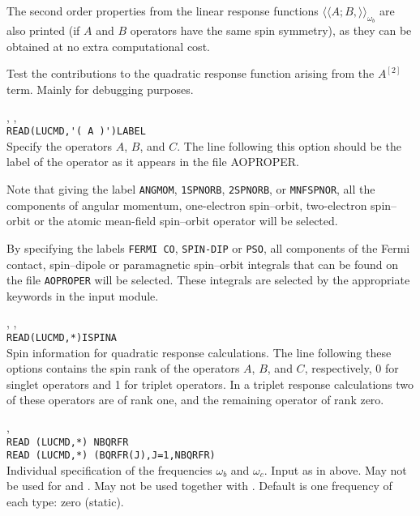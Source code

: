 The second order properties from the linear response functions
$\langle\!\langle A;B,\rangle\!\rangle_{\omega_b}$ are also printed
(if $A$ and $B$ operators have the same spin symmetry),
as they can be obtained at no extra computational cost.

\begin{description}

\item{}
Test the contributions to the quadratic response function arising from
the $A^{\left[2\right]}$ term. Mainly for debugging purposes.

\item{, , }\\
\verb|READ(LUCMD,'( A )')LABEL|\\
Specify the operators $A$, $B$, and $C$. The line following this
option should be the label of the operator as it appears in the file
AOPROPER.

Note that giving the label \verb|ANGMOM|, \verb|1SPNORB|,
\verb|2SPNORB|, or \verb|MNFSPNOR|, all the components of angular
momentum, one-electron spin--orbit, two-electron spin--orbit or the
atomic mean-field spin--orbit operator will be selected.

By specifying the labels \verb|FERMI CO|, \verb|SPIN-DIP| or
\verb|PSO|, all components of the Fermi contact, spin--dipole or
paramagnetic spin--orbit integrals that can be found on the file
\verb|AOPROPER| will be selected. These integrals are selected by the
appropriate keywords in the  input module.

\item{, , }\\
\verb|READ(LUCMD,*)ISPINA|\\
Spin information for quadratic response calculations.
The line following these options contains the spin
rank of the operators
$A$, $B$, and $C$, respectively, 0 for singlet operators and 1 for triplet
operators.
In a triplet response calculations two of these operators are of rank one,
and the remaining operator of rank zero.

\item{, }\\
\verb|READ (LUCMD,*) NBQRFR|\\
\verb|READ (LUCMD,*) (BQRFR(J),J=1,NBQRFR)|\\
Individual specification of the frequencies $\omega_b$ and $\omega_c$.
Input as in  above.
May not be used for  and .
May not be used together with .
Default is one frequency of each type: zero (static).


\end{description}
